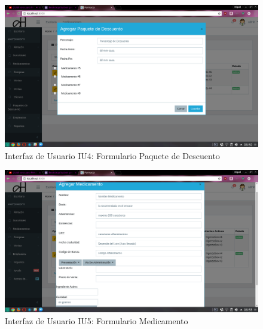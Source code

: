 \begin{figure}[htbp!]
	\begin{center}
\includegraphics[width=\textwidth]{Pantallas/FormularioPaqueteDescuento}
		\caption{Interfaz de Usuario IU4: Formulario Paquete de Descuento}
	\end{center}
\end{figure}





\begin{figure}[htbp!]
	\begin{center}
\includegraphics[width=\textwidth]{Pantallas/FormularioMedicamento}
		\caption{Interfaz de Usuario IU5: Formulario Medicamento}
	\end{center}
\end{figure}



